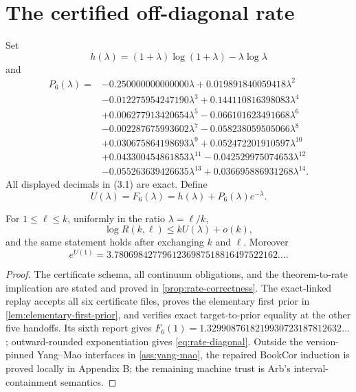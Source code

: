\section{The certified off-diagonal rate}\label{sec:rate}

Set
\[
 h(\lambda)=(1+\lambda)\log(1+\lambda)-\lambda\log\lambda
\]
and
\[
\begin{aligned}
P_6(\lambda)={}&-0.250000000000000\lambda
+0.019891840059418\lambda^2\\
&-0.012275954247190\lambda^3
+0.144110816398083\lambda^4\\
&+0.006277913420654\lambda^5
-0.066101623491668\lambda^6\\
&-0.002287675993602\lambda^7
-0.058238059505066\lambda^8\\
&+0.030675864198693\lambda^9
+0.052472201910597\lambda^{10}\\
&+0.043300454861853\lambda^{11}
-0.042529975074653\lambda^{12}\\
&-0.055263639426635\lambda^{13}
+0.036695886931268\lambda^{14}.
\end{aligned}
\tag{3.1}
\]
All displayed decimals in (3.1) are exact.  Define
\[
 U(\lambda)=F_6(\lambda)=h(\lambda)+P_6(\lambda)e^{-\lambda}.
 \tag{3.2}
\]

\begin{theorem}\label{thm:p6-rate}
For \(1\le\ell\le k\), uniformly in the ratio \(\lambda=\ell/k\),
\[
 \log R(k,\ell)\le kU(\lambda)+o(k),
 \tag{3.3}\label{eq:rate-bound}
\]
and the same statement holds after exchanging \(k\) and \(\ell\).  Moreover
\[
 e^{U(1)}=3.7806984277961236987518816497522162\ldots.
 \tag{3.4}\label{eq:rate-diagonal}
\]
\end{theorem}

\begin{proof}
The certificate schema, all continuum obligations, and the theorem-to-rate
implication are stated and proved in
\cref{prop:rate-correctness}.  The exact-linked replay accepts all six
certificate files, proves the elementary first prior in
\cref{lem:elementary-first-prior}, and verifies exact
target-to-prior equality at the other five handoffs.  Its sixth report gives
\(F_6(1)=1.3299087618219930723187812632\ldots\); outward-rounded
exponentiation gives \eqref{eq:rate-diagonal}.  Outside the version-pinned
Yang--Mao interfaces in \cref{ass:yang-mao}, the repaired BookCor induction is
proved locally in Appendix B; the remaining machine trust is Arb's
interval-containment semantics.
\end{proof}

